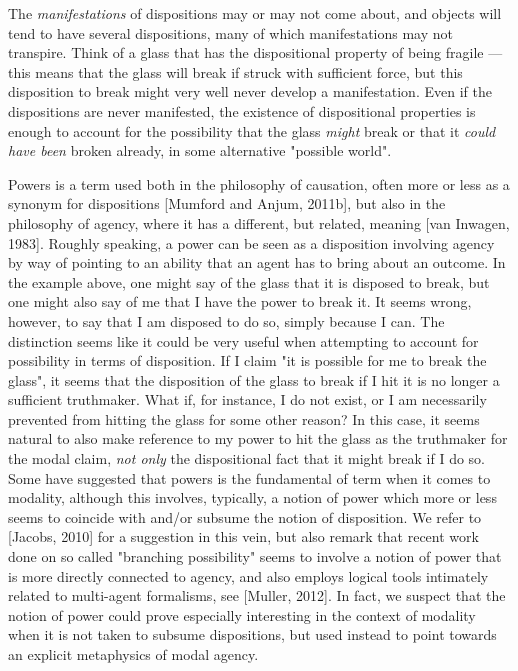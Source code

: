 \documentclass{article}
\begin{document}
The \emph{manifestations} of dispositions may or may not come about, and objects will tend to have several dispositions, many of which manifestations may not transpire. Think of a glass that has the dispositional property of being fragile --- this means that the glass will break if struck with sufficient force, but this disposition to break might very well never develop a manifestation. Even if the dispositions are never manifested, the existence of dispositional properties is enough to account for the possibility that the glass \emph{might} break or that it \emph{could have been} broken already, in some alternative "possible world".

Powers is a term used both in the philosophy of causation, often more or less as a
synonym for dispositions [Mumford and Anjum, 2011b], but also in the philosophy of
agency, where it has a different, but related, meaning [van Inwagen, 1983]. Roughly
speaking, a power can be seen as a disposition involving agency by way of pointing to
an ability that an agent has to bring about an outcome. In the example above, one
might say of the glass that it is disposed to break, but one might also say of me that
I have the power to break it. It seems wrong, however, to say that I am disposed to
do so, simply because I can.
The distinction seems like it could be very useful when attempting to account for
possibility in terms of disposition. If I claim "it is possible for me to break the glass",
it seems that the disposition of the glass to break if I hit it is no longer a sufficient
truthmaker. What if, for instance, I do not exist, or I am necessarily prevented from
hitting the glass for some other reason? In this case, it seems natural to also make
reference to my power to hit the glass as the truthmaker for the modal claim, \emph{not only} the dispositional fact that it might break if I do so. Some have suggested that powers is the fundamental of term when it comes to modality, although this involves, typically, a notion of power which more or less seems to coincide with and/or subsume
the notion of disposition. We refer to [Jacobs, 2010] for a suggestion in this vein, but also
remark that recent work done on so called "branching possibility" seems to involve a
notion of power that is more directly connected to agency, and also employs logical
tools intimately related to multi-agent formalisms, see [Muller, 2012].
In fact, we suspect that the notion of power could prove especially interesting in the
context of modality when it is not taken to subsume dispositions, but used instead
to point towards an explicit metaphysics of modal agency.
\end{document}
